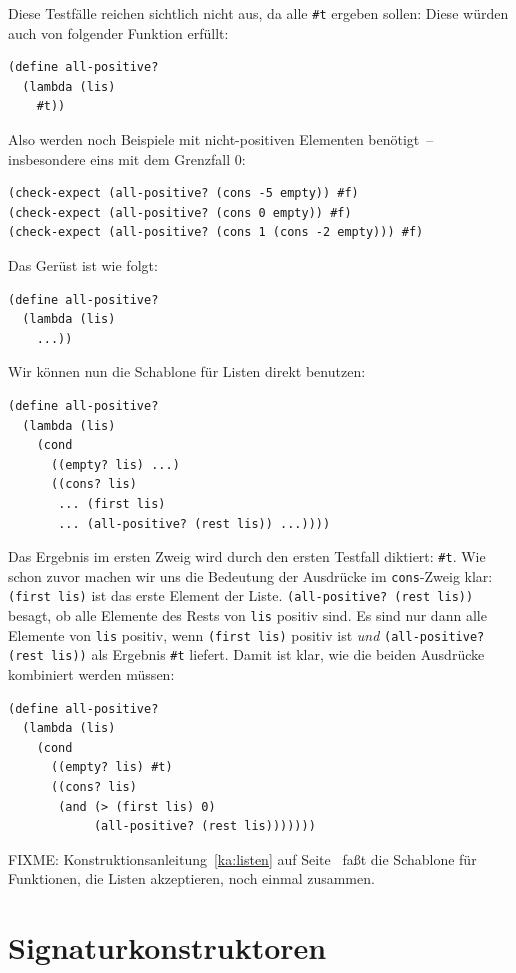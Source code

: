 Diese Testfälle reichen sichtlich nicht aus, da alle \verb|#t| ergeben
sollen: Diese würden auch von folgender Funktion erfüllt:
%
\begin{verbatim}
(define all-positive?
  (lambda (lis)
    #t))
\end{verbatim}
%
Also werden noch Beispiele mit nicht-positiven Elementen benötigt~--
insbesondere eins mit dem Grenzfall $0$:
\begin{verbatim}
(check-expect (all-positive? (cons -5 empty)) #f)
(check-expect (all-positive? (cons 0 empty)) #f)
(check-expect (all-positive? (cons 1 (cons -2 empty))) #f)
\end{verbatim}
%
Das Gerüst ist wie folgt:
%
\begin{verbatim}
(define all-positive?
  (lambda (lis)
    ...))
\end{verbatim}
%
Wir können nun die Schablone für Listen direkt benutzen:
%
\begin{verbatim}
(define all-positive?
  (lambda (lis)
    (cond
      ((empty? lis) ...)
      ((cons? lis)
       ... (first lis)
       ... (all-positive? (rest lis)) ...))))
\end{verbatim}
%
Das Ergebnis im ersten Zweig wird durch den ersten Testfall diktiert:
\verb|#t|.  Wie schon zuvor machen wir uns die Bedeutung der
Ausdrücke im \texttt{cons}-Zweig klar:
\texttt{(first lis)} ist das erste Element der Liste.
\texttt{(all-positive? (rest lis))} besagt, ob alle Elemente
des Rests von \texttt{lis} positiv sind.  Es sind nur dann alle
Elemente von \texttt{lis} positiv, wenn \texttt{(first lis)}
positiv ist \emph{und} \texttt{(all-positive? (rest lis))} als Ergebnis
\verb|#t| liefert.  Damit ist klar, wie die beiden Ausdrücke
kombiniert werden müssen:
%
\begin{verbatim}
(define all-positive?
  (lambda (lis)
    (cond
      ((empty? lis) #t)
      ((cons? lis)
       (and (> (first lis) 0)
            (all-positive? (rest lis)))))))
\end{verbatim}
%
FIXME: Konstruktionsanleitung~\ref{ka:listen} auf Seite~\pageref{ka:listen}
faßt die Schablone für Funktionen, die Listen akzeptieren, noch einmal
zusammen. %

\section{Signaturkonstruktoren}

